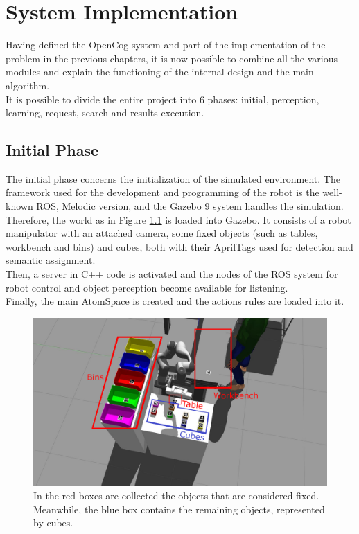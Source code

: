 
\chapter{System Implementation} \label{cha:algorithm}

Having defined the OpenCog system and part of the implementation of the problem in the previous chapters, it is now possible to combine all the various modules and explain the functioning of the internal design and the main algorithm. \\

It is possible to divide the entire project into 6 phases: initial, perception, learning, request, search and results execution.  

\section{Initial Phase}\label{sec:init}

The initial phase concerns the initialization of the simulated environment. The framework used for the development and programming of the robot is the well-known ROS, Melodic version, and the Gazebo 9 system handles the simulation. \\
Therefore, the world as in Figure \ref{fig:env_2_named} is loaded into Gazebo. 
It consists of a robot manipulator with an attached camera, some fixed objects (such as tables, workbench and bins) and cubes, both with their AprilTags used for detection and semantic assignment. \\
Then, a server in C++ code is activated and the nodes of the ROS system for robot control and object perception become available for listening. \\
Finally, the main AtomSpace is created and the actions rules are loaded into it. 

\begin{figure} [h]
\centering
\includegraphics[width=1.0
\textwidth]{figures/Magistrale/env_objs}
\caption[Environment Components Description]{ In the red boxes are collected the objects that are considered fixed. Meanwhile, the blue box contains the remaining objects, represented by cubes.
\label{fig:env_2_named}}
\end{figure} 

